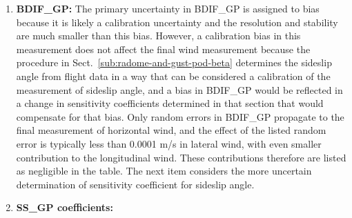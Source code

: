 \documentclass[12pt,twoside,english]{article}\usepackage[]{graphicx}\usepackage[]{color}
\let\OrgIndex\index
\renewcommand*{\index}[1]{\OrgIndex{#1}}
\begin{document}
{{\begin{enumerate}
\item \textbf{BDIF\_GP:} 
The primary uncertainty in BDIF\_GP is assigned to bias because it is likely a calibration uncertainty and the resolution and stability are much smaller than this bias. However, a calibration bias in this measurement does not affect the final wind measurement because the procedure in Sect.~\ref{sub:radome-and-gust-pod-beta} determines the sideslip angle from flight data in a way that can be considered a calibration of the measurement of sideslip angle, and a bias in BDIF\_GP would be reflected in a change in sensitivity coefficients determined in that section that would compensate for that bias. Only random errors in BDIF\_GP propagate to the final measurement of horizontal wind, and the effect of the listed random error is typically less than 0.0001 m/s in lateral wind, with even smaller contribution to the longitudinal wind. These contributions therefore are listed as negligible in the table. The next item considers the more uncertain determination of sensitivity coefficient for sideslip angle.  
\item \textbf{SS\_GP coefficients:} 

\end{enumerate}}}
\end{document}
